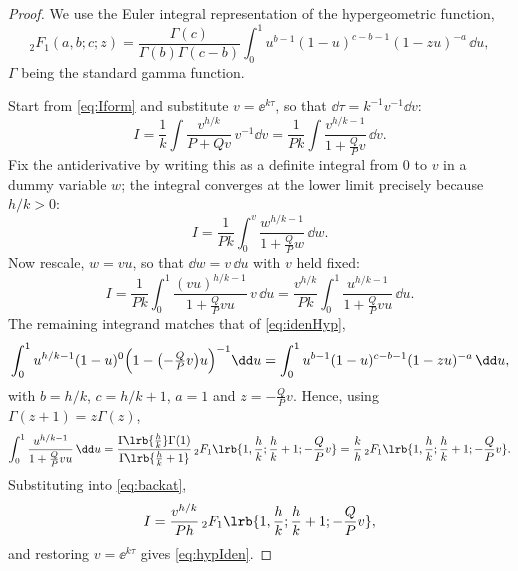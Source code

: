 \begin{proof}
We use the Euler integral representation of the hypergeometric function,
\begin{equation}
\label{eq:idenHyp}
{}_2F_1(a,b;c;z)
= \frac{\Gamma(c)}{\Gamma(b)\Gamma(c-b)}\int^1_0 u^{b-1}(1-u)^{c-b-1}(1-zu)^{-a}\,\dd u ,
\end{equation}
$\Gamma$ being the standard gamma function.

Start from \cref{eq:Iform} and substitute $v=\ee^{k\tau}$, so that
$\dd\tau = k^{-1}v^{-1}\dd v$:
\begin{equation*}
I = \frac{1}{k}\int\frac{v^{h/k}}{P+Qv}\,v^{-1}\dd v
  = \frac{1}{Pk}\int\frac{v^{h/k-1}}{1+\frac{Q}{P}v}\,\dd v .
\end{equation*}
Fix the antiderivative by writing this as a definite integral from $0$ to $v$ in a dummy
variable $w$; the integral converges at the lower limit precisely because $h/k>0$:
\begin{equation*}
I = \frac{1}{Pk}\int^v_0\frac{w^{h/k-1}}{1+\frac{Q}{P}w}\,\dd w .
\end{equation*}
Now rescale, $w = vu$, so that $\dd w = v\,\dd u$ with $v$ held fixed:
\begin{equation}
\label{eq:backat}
I = \frac{1}{Pk}\int^1_0\frac{(vu)^{h/k-1}}{1+\frac{Q}{P}vu}\,v\,\dd u
  = \frac{v^{h/k}}{Pk}\int^1_0\frac{u^{h/k-1}}{1+\frac{Q}{P}vu}\,\dd u .
\end{equation}
The remaining integrand matches that of \cref{eq:idenHyp},
\begin{equation*}
\int^1_0 u^{h/k-1}(1-u)^{0}\Bigl(1-\bigl(-\tfrac{Q}{P}v\bigr)u\Bigr)^{-1}\dd u
= \int^1_0 u^{b-1}(1-u)^{c-b-1}(1-zu)^{-a}\,\dd u ,
\end{equation*}
with $b = h/k$, $c = h/k+1$, $a=1$ and $z = -\tfrac{Q}{P}v$. Hence, using
$\Gamma(z+1) = z\Gamma(z)$,
\begin{equation*}
\int^1_0\frac{u^{h/k-1}}{1+\frac{Q}{P}vu}\,\dd u
= \frac{\Gamma\!\lrb{\frac{h}{k}}\Gamma(1)}{\Gamma\!\lrb{\frac{h}{k}+1}}\,
  {}_2F_1\lrb{1,\frac{h}{k};\frac{h}{k}+1;-\frac{Q}{P}v}
= \frac{k}{h}\,{}_2F_1\lrb{1,\frac{h}{k};\frac{h}{k}+1;-\frac{Q}{P}v}.
\end{equation*}
Substituting into \cref{eq:backat},
\begin{equation*}
I = \frac{v^{h/k}}{Ph}\,{}_2F_1\lrb{1,\frac{h}{k};\frac{h}{k}+1;-\frac{Q}{P}v},
\end{equation*}
and restoring $v=\ee^{k\tau}$ gives \cref{eq:hypIden}.
\end{proof}

